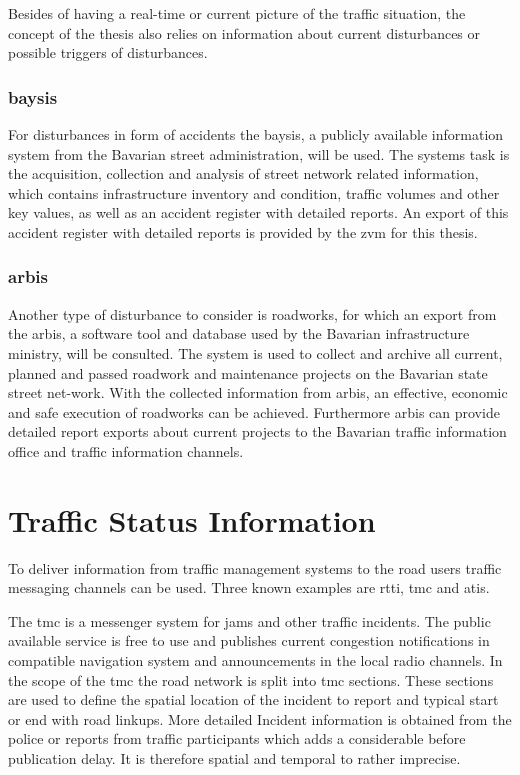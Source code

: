 Besides of having a real-time or current picture of the traffic situation, the concept of the thesis also relies on information about current disturbances or possible triggers of disturbances. 

\subsubsection{\acrfull{baysis}}
For disturbances in form of accidents the \acrfull{baysis}, a publicly available information system from the Bavarian street administration, will be used. The systems task is the acquisition, collection and analysis of street network related information, which contains infrastructure inventory and condition, traffic volumes and other key values, as well as an accident register with detailed reports. An export of this accident register with detailed reports is provided by the \acrfull{zvm} for this thesis.

\subsubsection{\acrfull{arbis}}
Another type of disturbance to consider is roadworks, for which an export from the \acrfull{arbis}, a software tool and database used by the Bavarian infrastructure ministry, will be consulted. The system is used to collect and archive all current, planned and passed roadwork and maintenance projects on the Bavarian state street net-work. With the collected information from \acrshort{arbis}, an effective, economic and safe execution of roadworks can be achieved. Furthermore \acrshort{arbis} can provide detailed report exports about current projects to the Bavarian traffic information office and traffic information channels. \parencite{trafficon2017}

\section{Traffic Status Information}
\label{introduction_traffic_status_information}
To deliver information from traffic management systems to the road users traffic messaging channels can be used. Three known examples are \acrfull{rtti}, \acrfull{tmc} and \acrfull{atis}.

The \acrshort{tmc} is a messenger system for jams and other traffic incidents. The public available service is free to use and publishes current congestion notifications in compatible navigation system and announcements in the local radio channels. In the scope of the \acrshort{tmc} the road network is split into \acrshort{tmc} sections. These sections are used to define the spatial location of the incident to report and typical start or end with road linkups. More detailed Incident information is obtained from the police or reports from traffic participants which adds a considerable before publication delay. It is therefore spatial and temporal to rather imprecise. \parencite{LAPID2020}

